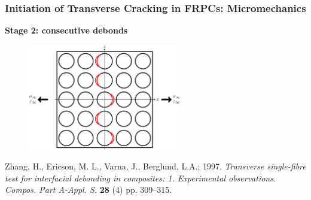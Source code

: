 \documentclass[first,firstsupp,lastsupp,last,hyperref,table]{ETHclass}
\begin{document}
\begin{frame}
\frametitle{\vspace{0.2cm}\small Initiation of Transverse Cracking in FRPCs: Micromechanics}
\vspace{-0.5cm}
\centering
\begin{alertblock}{\centering\scriptsize\bf Stage 2: consecutive debonds}
\vspace{-0.25cm}
\begin{figure}
\centering
\includegraphics[width=0.6\textwidth]{stage2-critdebonds.pdf}
\end{figure}
\end{alertblock}
\vspace{-0.5cm}
{\tiny Zhang, H., Ericson, M. L., Varna, J., Berglund, L.A.; 1997. {\em\tiny Transverse single-fibre test for interfacial debonding in composites: 1. Experimental observations}. {\it\tiny Compos. Part A-Appl. S.} {\bf\tiny 28} (4) pp. 309--315.}
\end{frame}

\addtocounter{framenumber}{-1}
\end{document}
